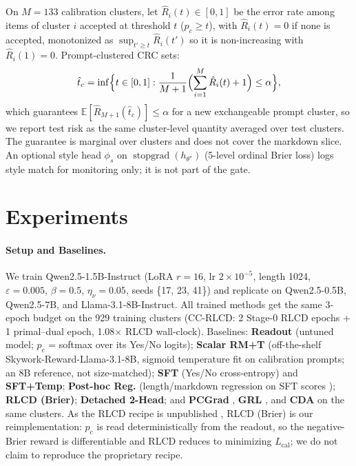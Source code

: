 \documentclass[letterpaper]{article} %
\begin{document}
On $M{=}133$ calibration clusters, let $\hat{R}_i(t)\in[0,1]$ be the error rate among items of cluster $i$ accepted at threshold $t$ ($p_c\ge t$), with $\hat{R}_i(t)=0$ if none is accepted, monotonized as $\sup_{t'\ge t}\hat{R}_i(t')$ so it is non-increasing with $\hat{R}_i(1)=0$. Prompt-clustered CRC \citep{angelopoulos2024conformal} sets:
\begin{equation}
\hat{t}_c = \inf\Bigl\{t\in[0,1] : \frac{1}{M+1}\Bigl(\sum_{i=1}^{M}\hat{R}_i(t) + 1\Bigr) \le \alpha \Bigr\},
\label{eq:crc}
\end{equation}
which guarantees $\mathbb{E}[\hat{R}_{M+1}(\hat{t}_c)]\le \alpha$ for a new exchangeable prompt cluster, so we report test risk as the same cluster-level quantity averaged over test clusters. The guarantee is marginal over clusters and does not cover the markdown slice. An optional style head $\phi_s$ on $\operatorname{stopgrad}(h_{\theta^\star})$ (5-level ordinal Brier loss) logs style match for monitoring only; it is not part of the gate.

\section{Experiments}

\paragraph{Setup and Baselines.}
We train Qwen2.5-1.5B-Instruct (LoRA $r{=}16$, lr $2\times10^{-5}$, length 1024, $\varepsilon{=}0.005$, $\beta{=}0.5$, $\eta_\nu{=}0.05$, seeds \{17, 23, 41\}) and replicate on Qwen2.5-0.5B, Qwen2.5-7B, and Llama-3.1-8B-Instruct. All trained methods get the same 3-epoch budget on the 929 training clusters (CC-RLCD: 2 Stage-0 RLCD epochs + 1 primal--dual epoch, 1.08$\times$ RLCD wall-clock). Baselines: \textbf{Readout} (untuned model; $p_c$ = softmax over its Yes/No logits); \textbf{Scalar RM+T} (off-the-shelf Skywork-Reward-Llama-3.1-8B, sigmoid temperature fit on calibration prompts; an 8B reference, not size-matched); \textbf{SFT} (Yes/No cross-entropy) and \textbf{SFT+Temp}; \textbf{Post-hoc Reg.} (length/markdown regression on SFT scores \citep{huang2025posthoc}); \textbf{RLCD (Brier)}; \textbf{Detached 2-Head}; and \textbf{PCGrad} \citep{yu2020gradient}, \textbf{GRL} \citep{ganin2015unsupervised}, and \textbf{CDA} \citep{kim2026causal} on the same clusters. As the RLCD recipe is unpublished \citep{typesafe2026jev}, RLCD (Brier) is our reimplementation: $p_c$ is read deterministically from the readout, so the negative-Brier reward is differentiable and RLCD reduces to minimizing $L_{\mathrm{cal}}$; we do not claim to reproduce the proprietary recipe.
\end{document}
